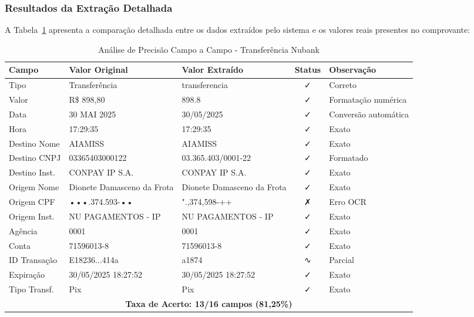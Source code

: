 \subsubsection{Resultados da Extração Detalhada}

A Tabela~\ref{tab:precisao-nubank} apresenta a comparação detalhada entre os dados extraídos pelo sistema e os valores reais presentes no comprovante:

\begin{table}[htbp]
\centering
\caption{Análise de Precisão Campo a Campo - Transferência Nubank}
\label{tab:precisao-nubank}
\small
\begin{tabular}{|l|p{3cm}|p{3cm}|c|p{2cm}|}
\hline
\textbf{Campo} & \textbf{Valor Original} & \textbf{Valor Extraído} & \textbf{Status} & \textbf{Observação} \\
\hline
Tipo & Transferência & transferencia & ✓ & Correto \\
\hline
Valor & R\$ 898,80 & 898.8 & ✓ & Formatação numérica \\
\hline
Data & 30 MAI 2025 & 30/05/2025 & ✓ & Conversão automática \\
\hline
Hora & 17:29:35 & 17:29:35 & ✓ & Exato \\
\hline
Destino Nome & AIAMISS & AIAMISS & ✓ & Exato \\
\hline
Destino CNPJ & 03365403000122 & 03.365.403/0001-22 & ✓ & Formatado \\
\hline
Destino Inst. & CONPAY IP S.A. & CONPAY IP S.A. & ✓ & Exato \\
\hline
Origem Nome & Dionete Damasceno da Frota & Dionete Damasceno da Frota & ✓ & Exato \\
\hline
Origem CPF & •••.374.593-•• & ".,374,598-++ & ✗ & Erro OCR \\
\hline
Origem Inst. & NU PAGAMENTOS - IP & NU PAGAMENTOS - IP & ✓ & Exato \\
\hline
Agência & 0001 & 0001 & ✓ & Exato \\
\hline
Conta & 71596013-8 & 71596013-8 & ✓ & Exato \\
\hline
ID Transação & E18236...414a & a1874 & ∿ & Parcial \\
\hline
Expiração & 30/05/2025 18:27:52 & 30/05/2025 18:27:52 & ✓ & Exato \\
\hline
Tipo Transf. & Pix & Pix & ✓ & Exato \\
\hline
\multicolumn{5}{|c|}{\textbf{Taxa de Acerto: 13/16 campos (81,25\%)}} \\
\hline
\end{tabular}
\end{table}

